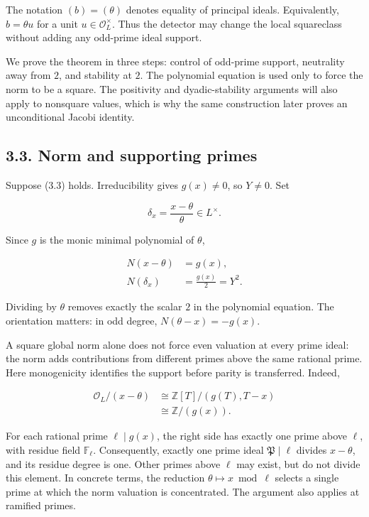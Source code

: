 \documentclass[11pt,a4paper]{article}
\begin{document}
The notation \((b)=(\theta)\) denotes equality of principal ideals.
Equivalently, \(b=\theta u\) for a unit \(u\in\mathcal O_L^\times\).
Thus the detector may change the local squareclass without adding any
odd-prime ideal support.

We prove the theorem in three steps: control of odd-prime support,
neutrality away from \(2\), and stability at \(2\). The polynomial
equation is used only to force the norm to be a square. The positivity
and dyadic-stability arguments will also apply to nonsquare values,
which is why the same construction later proves an unconditional Jacobi
identity.

\subsection{3.3. Norm and supporting primes}\label{valuation-transfer}

Suppose (3.3) holds. Irreducibility gives \(g(x)\ne0\), so \(Y\ne0\).
Set

\[
\delta_x=\frac{x-\theta}{\theta}\in L^\times.
\]

Since \(g\) is the monic minimal polynomial of \(\theta\),

\[
\begin{aligned}
N(x-\theta)&=g(x),\\
N(\delta_x)&=\frac{g(x)}2=Y^2.
\end{aligned}
\tag{3.4}
\]

Dividing by \(\theta\) removes exactly the scalar \(2\) in the
polynomial equation. The orientation matters: in odd degree,
\(N(\theta-x)=-g(x)\).

A square global norm alone does not force even valuation at every prime
ideal: the norm adds contributions from different primes above the same
rational prime. Here monogenicity identifies the support before parity
is transferred. Indeed,

\[
\begin{aligned}
\mathcal O_L/(x-\theta)
&\cong\mathbb Z[T]/(g(T),T-x)\\
&\cong\mathbb Z/(g(x)).
\end{aligned}
\tag{3.5}
\]

For each rational prime \(\ell\mid g(x)\), the right side has exactly
one prime above \(\ell\), with residue field \(\mathbb F_\ell\).
Consequently, exactly one prime ideal \(\mathfrak P\mid\ell\) divides
\(x-\theta\), and its residue degree is one. Other primes above \(\ell\)
may exist, but do not divide this element. In concrete terms, the
reduction \(\theta\mapsto x\bmod\ell\) selects a single prime at which
the norm valuation is concentrated. The argument also applies at
ramified primes.
\end{document}

